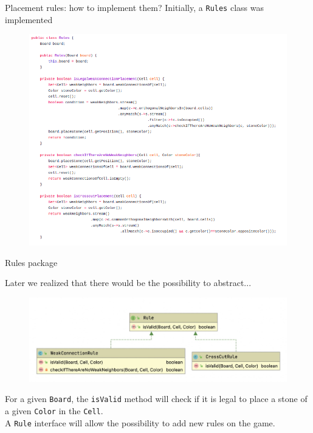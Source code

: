 \documentclass{beamer}
\begin{document}
\begin{frame}{Placement rules: how to implement them?}
	Initially, a \texttt{Rules} class was implemented
	\vspace{0.2cm}
	\begin{figure}
		\includegraphics[scale=0.28]{images/rules-class.png}
	\end{figure}
\end{frame}

\begin{frame}{Rules package}
	
	Later we realized that there would be the possibility to abstract...
	\begin{figure}
		\includegraphics[scale=0.4]{images/rules-uml.jpg}
	\end{figure}
	
	For a given \texttt{Board}, the \texttt{isValid} method will check if it is legal to place a stone of a given \texttt{Color} in the \texttt{Cell}. \\
	\vspace{0.1cm}
	A \texttt{Rule} interface will allow the possibility to add new rules on the game.
	
\end{frame}
\end{document}
